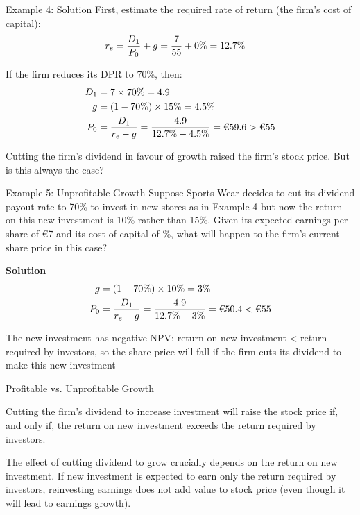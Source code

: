 \documentclass[9pt,aspectratio=169]{beamer}
\newcommand{\keypoint}[1]{%
  \par\noindent
  \begingroup
  \usebeamercolor{keypoint}%
  \setlength{\fboxsep}{7pt}%
  \colorbox{bg}{\parbox{\dimexpr\linewidth-2\fboxsep\relax}{\color{fg}#1}}%
  \endgroup
  \par\medskip}
\begin{document}
\begin{frame}{Example 4: Solution}
First, estimate the required rate of return (the firm's cost of capital):
\begin{align}\nonumber
r_e &= \frac{D_1}{P_0} + g = \frac{7}{55} + 0\% = 12.7\%
\end{align}

If the firm reduces its DPR to 70\%, then:
\begin{align}\nonumber
D_1 &= 7 \times 70\% = 4.9 \\\nonumber
g &= (1 - 70\%) \times 15\% = 4.5\% \\\nonumber
P_0 &= \frac{D_1}{r_e - g} = \frac{4.9}{12.7\% - 4.5\%} = \text{€}59.6 > \text{€} 55
\end{align}

Cutting the firm's dividend in favour of growth raised the firm's stock price. But is this always the case?

\end{frame}

\begin{frame}{Example 5: Unprofitable Growth}
Suppose Sports Wear decides to cut its dividend payout rate to 70\% to invest in new stores as in Example 4 but now the return on this new investment is 10\% rather than 15\%. Given its expected earnings per share of €7 and its cost of capital of \LSportsRequired\%, what will happen to the firm's current share price in this case?

\vspace{1cm}
\textbf{Solution}
\begin{align}\nonumber
g &= (1 - 70\%) \times 10\% = 3\% \\\nonumber
P_0 &= \frac{D_1}{r_e - g} = \frac{4.9}{12.7\% - 3\%} = \text{€}50.4 < \text{€} 55
\end{align}

The new investment has negative NPV: return on new investment < return required by investors, so the share price will fall if the firm cuts its dividend to make this new investment


\end{frame}

\begin{frame}{Profitable vs. Unprofitable Growth}
\keypoint{Cutting the firm's dividend to increase investment will raise the stock price
if, and only if, the return on new investment exceeds the return required by investors.}

The effect of cutting dividend to grow crucially depends on the return on new investment.
If new investment is expected to earn only the return required by investors, reinvesting
earnings does not add value to stock price (even though it will lead to earnings growth).
\end{frame}
\end{document}
